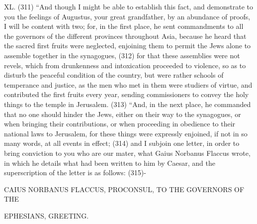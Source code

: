 XL. (311) ``And though I might be able to establish this fact, and demonstrate to you the feelings of
Augustus, your great grandfather, by an abundance of proofs, I will be content with two; for, in the
first place, he sent commandments to all the governors of the different provinces throughout Asia,
because he heard that the sacred first fruits were neglected, enjoining them to permit the Jews
alone to assemble together in the synagogues, (312) for that these assemblies were not revels,
which from drunkenness and intoxication proceeded to violence, so as to disturb the peaceful
condition of the country, but were rather schools of temperance and justice, as the men who met in
them were studiers of virtue, and contributed the first fruits every year, sending commissioners to
convey the holy things to the temple in Jerusalem. (313) ``And, in the next place, he commanded
that no one should hinder the Jews, either on their way to the synagogues, or when bringing their
contributions, or when proceeding in obedience to their national laws to Jerusalem, for these things
were expressly enjoined, if not in so many words, at all events in effect; (314) and I subjoin one
letter, in order to bring conviction to you who are our mater, what Gaius Norbanus Flaccus wrote,
in which he details what had been written to him by Caesar, and the superscription of the letter is
as follows: (315)-

CAIUS NORBANUS FLACCUS, PROCONSUL, TO THE GOVERNORS OF THE

EPHESIANS, GREETING.

